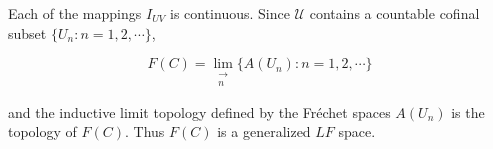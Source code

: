 Each of the mappings $I_{UV}$ is continuous. Since $\mathcal{U}$ contains a countable cofinal subset $\{U_n: n = 1, 2, \cdots\}$,

$$F(C) = \lim_{\substack{\longrightarrow \\ n}} \{A(U_n): n = 1, 2, \cdots\}$$

and the inductive limit topology defined by the Fréchet spaces $A(U_n)$ is the topology of $F(C)$. Thus $F(C)$ is a generalized $LF$ space.
